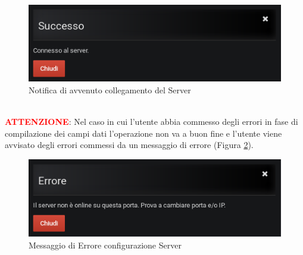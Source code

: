 \begin{figure}[H]
	\begin{center}
		\includegraphics[scale=0.6]{./images/NotificaServer.png}
		 \caption{Notifica di avvenuto collegamento del Server}	
		 \label{NotificaServer}
	\end{center}
\end{figure}

~\\
\textbf{\textcolor{red}{ATTENZIONE}}: Nel caso in cui l'utente abbia commesso degli errori in fase di compilazione dei campi dati l'operazione non va a buon fine e l'utente viene avvisato degli errori commessi da un messaggio di errore (Figura \ref{ErroreServer}).

\begin{figure}[H]
	\begin{center}
		\includegraphics[scale=0.6]{./images/ErroreServer.png}
		 \caption{Messaggio di Errore configurazione Server}	
		 \label{ErroreServer}
	\end{center}
\end{figure}
